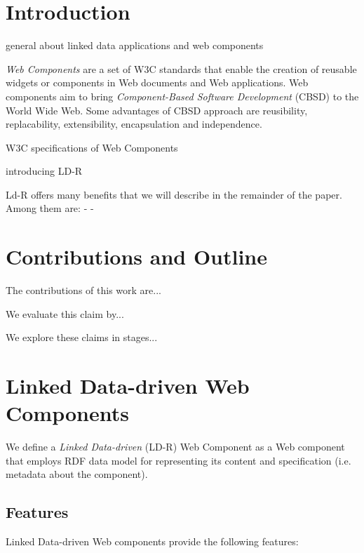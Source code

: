 \documentclass{acm_proc_article-sp}
\begin{document}




\section{Introduction}
general about linked data applications and web components

\emph{Web Components} are a set of W3C standards that enable the creation of reusable widgets or components in Web documents and Web applications.
Web components aim to bring \emph{Component-Based Software Development} (CBSD) to the World Wide Web.
Some advantages of CBSD approach are reusibility, replacability, extensibility, encapsulation and independence.

W3C specifications of Web Components \cite{webcomponentsW3C}

introducing LD-R


Ld-R offers many benefits that we will describe in the remainder of the paper. Among them are:
-
-
\section{Contributions and Outline}
The contributions of this work are...

We evaluate this claim by...

We explore these claims in stages...


\section{Linked Data-driven Web Components}

We define a \emph{Linked Data-driven} (LD-R) Web Component as a Web component that employs RDF data model for representing its content and specification (i.e. metadata about the component).

\subsection{Features}

Linked Data-driven Web components provide the following features:
\end{document}
